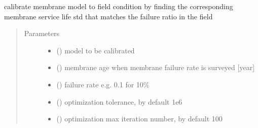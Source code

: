 \documentclass[letterpaper,10pt,english]{sphinxmanual}
\begin{document}

\begin{fulllineitems}
\label{\detokenize{membrane:membrane.calibrate_f}}
\sphinxAtStartPar
calibrate membrane model to field condition by finding the corresponding membrane service life std that matches the failure ratio in the field
\begin{quote}\begin{description}
\item[{Parameters}] \leavevmode\begin{itemize}
\item {} 
\sphinxAtStartPar
{} () \textendash{} model to be calibrated

\item {} 
\sphinxAtStartPar
{} (\sphinxstyleliteralemphasis{\sphinxupquote{, }}) \textendash{} membrane age when membrane failure rate is surveyed {[}year{]}

\item {} 
\sphinxAtStartPar
{} () \textendash{} failure rate e.g. 0.1 for 10\%

\item {} 
\sphinxAtStartPar
{} (\sphinxstyleliteralemphasis{\sphinxupquote{, }}) \textendash{} optimization tolerance, by default 1e\sphinxhyphen{}6

\item {} 
\sphinxAtStartPar
{} (\sphinxstyleliteralemphasis{\sphinxupquote{, }}) \textendash{} optimization max iteration number, by default 100


\end{itemize}
\end{description}
\end{quote}
\end{fulllineitems}
\end{document}
